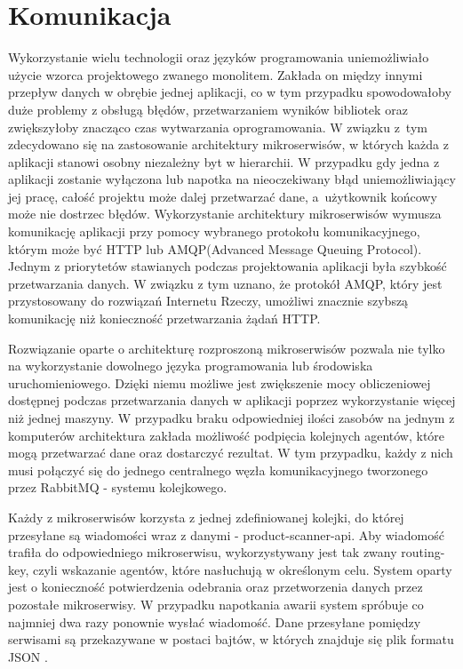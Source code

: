 \section{Komunikacja}
{Wykorzystanie wielu technologii oraz języków programowania uniemożliwiało użycie wzorca projektowego zwanego monolitem. Zakłada on między innymi przepływ danych w obrębie jednej aplikacji, co w tym przypadku spowodowałoby duże problemy z obsługą błędów, przetwarzaniem wyników bibliotek oraz zwiększyłoby znacząco czas wytwarzania oprogramowania. W związku z~tym zdecydowano się na zastosowanie architektury mikroserwisów, w których każda z aplikacji stanowi osobny niezależny byt w hierarchii. W przypadku gdy jedna z aplikacji zostanie wyłączona lub napotka na nieoczekiwany błąd uniemożliwiający jej pracę, całość projektu może dalej przetwarzać dane, a~użytkownik końcowy może nie dostrzec błędów. Wykorzystanie architektury mikroserwisów wymusza komunikację aplikacji przy pomocy wybranego protokołu komunikacyjnego, którym może być HTTP lub AMQP(Advanced Message Queuing Protocol)\cite{AMQP}. Jednym z priorytetów stawianych podczas projektowania aplikacji była szybkość przetwarzania danych. W związku z tym uznano, że protokół AMQP, który jest przystosowany do rozwiązań Internetu Rzeczy, umożliwi znacznie szybszą komunikację niż konieczność przetwarzania żądań HTTP. 
	
	
Rozwiązanie oparte o architekturę rozproszoną mikroserwisów pozwala nie tylko na wykorzystanie dowolnego języka programowania lub środowiska uruchomieniowego. Dzięki niemu możliwe jest zwiększenie mocy obliczeniowej dostępnej podczas przetwarzania danych w aplikacji poprzez wykorzystanie więcej niż jednej maszyny. W przypadku braku odpowiedniej ilości zasobów na jednym z komputerów architektura zakłada możliwość podpięcia kolejnych agentów, które mogą przetwarzać dane oraz dostarczyć rezultat. W tym przypadku, każdy z nich musi połączyć się do jednego centralnego węzła komunikacyjnego tworzonego przez RabbitMQ \cite{RabbitMQ} - systemu kolejkowego.

Każdy z mikroserwisów korzysta z jednej zdefiniowanej kolejki, do której przesyłane są wiadomości wraz z danymi - product-scanner-api. Aby wiadomość trafiła do odpowiedniego mikroserwisu, wykorzystywany jest tak zwany routing-key, czyli wskazanie agentów, które nasłuchują w określonym celu. System oparty jest o konieczność potwierdzenia odebrania oraz przetworzenia danych przez pozostałe mikroserwisy. W przypadku napotkania awarii system spróbuje co najmniej dwa razy ponownie wysłać wiadomość. Dane przesyłane pomiędzy serwisami są przekazywane w postaci bajtów, w których znajduje się plik formatu JSON \cite{JSON}. 
}
	
